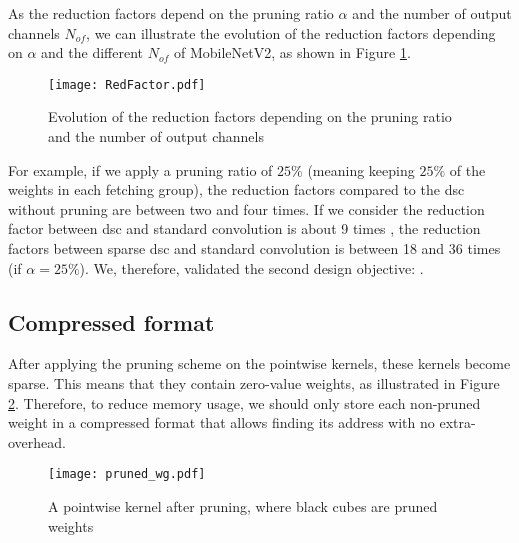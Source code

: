 As the reduction factors depend on the pruning ratio $\alpha$ and the number of output channels $N_{of}$, we can illustrate the evolution of the reduction factors depending on $\alpha$ and the different $N_{of}$ of MobileNetV2, as shown in Figure \ref{fig:redfacto}.
%
\begin{figure}[H]
    \centering
    \texttt{[image: RedFactor.pdf]}
    \caption{Evolution of the reduction factors depending on the pruning ratio and the number of output channels}
    \label{fig:redfacto}
\end{figure}

For example, if we apply a pruning ratio of $25\%$ (meaning keeping $25\%$ of the weights in each fetching group), the reduction factors compared to the \acrshort{dsc} without pruning are between two and four times. If we consider the reduction factor between \acrshort{dsc} and standard convolution is about 9 times \cite{zhang_channel_2019}, the reduction factors between sparse \acrshort{dsc} and standard convolution is between 18 and 36 times (if $\alpha = 25\%$). We, therefore, validated the second design objective: \textbf{}.
%
\subsection{Compressed format} \label{subs:compress_f}
%
After applying the pruning scheme on the pointwise kernels, these kernels become sparse. This means that they contain zero-value weights, as illustrated in Figure \ref{fig:pruned_wg}. Therefore, to reduce memory usage, we should only store each non-pruned weight in a compressed format that allows finding its address with no extra-overhead.
%
\begin{figure}[H]
    \centering
    \texttt{[image: pruned\_wg.pdf]}
    \caption{A pointwise kernel after pruning, where black cubes are pruned weights}
    \label{fig:pruned_wg}
\end{figure}


